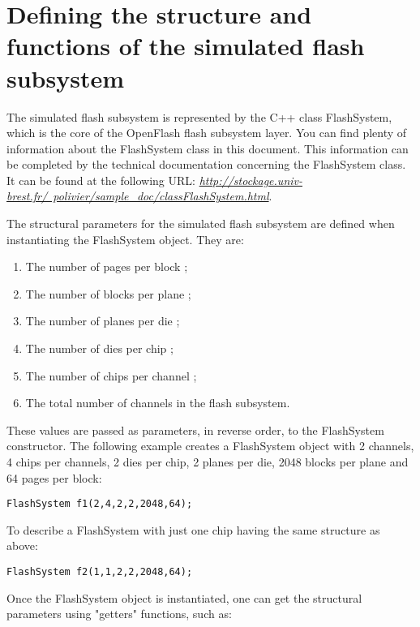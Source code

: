 \section{Defining the structure and functions of the simulated flash subsystem}

The simulated flash subsystem is represented by the C++ class FlashSystem, which is the core of the OpenFlash flash subsystem layer. You can find plenty of information about the FlashSystem class in this document. This information can be completed by the technical documentation concerning the FlashSystem class. It can be found at the following URL: \href{http://stockage.univ-brest.fr/~polivier/sample_doc/classFlashSystem.html}{\textit{http://stockage.univ-brest.fr/~polivier/sample\_doc/classFlashSystem.html}}.

The structural parameters for the simulated flash subsystem are defined when instantiating the FlashSystem object. They are:

\begin{enumerate}
  \item The number of pages per block ;
  \item The number of blocks per plane ;
  \item The number of planes per die ;
  \item The number of dies per chip ;
  \item The number of chips per channel ;
  \item The total number of channels in the flash subsystem.
\end{enumerate}

These values are passed as parameters, in reverse order, to the FlashSystem constructor. The following example creates a FlashSystem object with 2 channels, 4 chips per channels, 2 dies per chip, 2 planes per die, 2048 blocks per plane and 64 pages per block:

\begin{lstlisting}
FlashSystem f1(2,4,2,2,2048,64);
\end{lstlisting}

To describe a FlashSystem with just one chip having the same structure as above:

\begin{lstlisting}
FlashSystem f2(1,1,2,2,2048,64);
\end{lstlisting}

Once the FlashSystem  object is instantiated, one can get the structural parameters using "getters" functions, such as:

